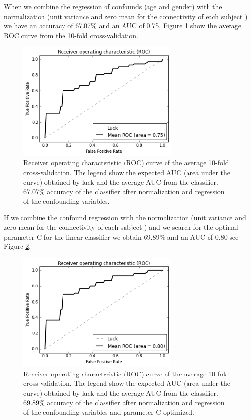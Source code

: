 \documentclass[12pt,journal,compsoc]{IEEEtran}
\begin{document}
When we combine the regression of confounds (age and gender) with the normalization (unit variance and zero mean for the connectivity of each subject ) we have an accuracy of 67.07\% and an AUC of 0.75, Figure \ref{fig_svc_norm_cnotopt} show the average ROC curve from the 10-fold cross-validation.


\begin{figure}[h]
\centering
\includegraphics[width=8cm]{svc_linear_cnotopt_normalized_scale64x64.png}
\caption{Receiver operating characteristic (ROC) curve of the average 10-fold cross-validation. The legend show the expected AUC (area under the curve) obtained by luck and the average AUC from the classifier. 67.07\% accuracy of the classifier after normalization and regression of the confounding variables.}
\label{fig_svc_norm_cnotopt}
\end{figure}


If we combine the confound regression with the normalization (unit variance and zero mean for the connectivity of each subject ) and we search for the optimal parameter C for the linear classifier we obtain 69.89\% and an AUC of 0.80 see Figure \ref{fig_svc_norm}.


\begin{figure}[h]
\centering
\includegraphics[width=8cm]{svc_linear_normalized_scale64x64.png}
\caption{Receiver operating characteristic (ROC) curve of the average 10-fold cross-validation. The legend show the expected AUC (area under the curve) obtained by luck and the average AUC from the classifier. 69.89\% accuracy of the classifier after normalization and regression of the confounding variables and parameter C optimized.}
\label{fig_svc_norm}
\end{figure}
\end{document}
